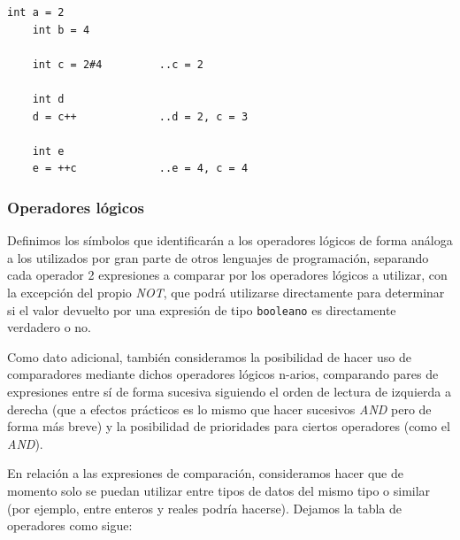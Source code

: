 \documentclass[11pt, english]{article}
\begin{document}
	\begin{lstlisting}[caption=Ejemplo de uso los operadores artiméticos]
	int a = 2
	int b = 4
	
	int c = 2#4			..c = 2
	
	int d
	d = c++				..d = 2, c = 3
	
	int e
	e = ++c				..e = 4, c = 4
	\end{lstlisting}
	
	\subsubsection{Operadores lógicos}
	Definimos los símbolos que identificarán a los operadores lógicos de forma análoga a los utilizados por gran parte de otros lenguajes de programación, separando cada operador 2 expresiones a comparar por los operadores lógicos a utilizar, con la excepción del propio \emph{NOT}, que podrá utilizarse directamente para determinar si el valor devuelto por una expresión de tipo \texttt{booleano} es directamente verdadero o no. 
	
	
	Como dato adicional, también consideramos la posibilidad de hacer uso de comparadores mediante dichos operadores lógicos n-arios, comparando pares de expresiones entre sí de forma sucesiva siguiendo el orden de lectura de izquierda a derecha (que a efectos prácticos es lo mismo que hacer sucesivos \emph{AND} pero de forma más breve) y la posibilidad de prioridades para ciertos operadores (como el \emph{AND}). \vspace{0px}
	
	En relación a las expresiones de comparación, consideramos hacer que de momento solo se puedan utilizar entre tipos de datos del mismo tipo o similar (por ejemplo, entre enteros y reales podría hacerse). Dejamos la tabla de operadores como sigue: \vspace{0px}
	
\end{document}

